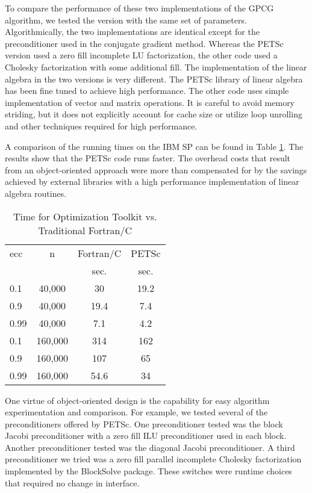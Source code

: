 To compare the performance of these two implementations of the GPCG
algorithm, we tested the version with the same set of parameters.
Algorithmically, the two implementations are identical except for
the preconditioner used in the conjugate gradient method.  Whereas
the PETSc version used a zero fill incomplete LU factorization, the
other code used a Cholesky factorization with some additional fill.
The implementation  of the linear algebra in the two versions is very
different.
The PETSc library of linear algebra has
been fine tuned to achieve high performance.  The other
code uses simple implementation of vector and matrix operations.
It is careful to avoid memory striding, but
it does not explicitly account for cache size
or utilize loop unrolling and other techniques required for
high performance.

A comparison of the running times on the IBM SP can be found
in Table \ref{legacy}.
The results show that the PETSc code runs faster.
The overhead costs that result from an object-oriented approach
were more than compensated for by the savings achieved by
external libraries with a high performance implementation
of linear algebra routines.

\begin{table}[h]
\begin{center}
\hspace{.5cm}

\begin{tabular}{|lccc|}
\hline
ecc & n & Fortran/C  & PETSc \\
 & & sec.  & sec. \\
\hline
0.1 & 40,000 & 30 & 19.2\\
0.9 & 40,000&  19.4 & 7.4\\
0.99 & 40,000 & 7.1 & 4.2\\
0.1 & 160,000 & 314 & 162 \\
0.9 & 160,000 & 107 & 65 \\
0.99 & 160,000 & 54.6 & 34 \\
\hline
\end{tabular}
\label{legacy}
\caption{Time for Optimization Toolkit vs. Traditional Fortran/C}
\end{center}
\end{table}

One virtue of object-oriented design is the capability for easy algorithm
experimentation and comparison.  For example,
we tested several of the preconditioners
offered by PETSc.
One preconditioner tested was the block Jacobi preconditioner with
a zero fill ILU preconditioner used in each block.
Another preconditioner tested was the diagonal Jacobi preconditioner.
A third preconditioner we tried was a zero fill parallel incomplete Cholesky
factorization implemented by the BlockSolve package\cite{bs-user-ref}.
These switches were runtime choices that required no change in interface.

